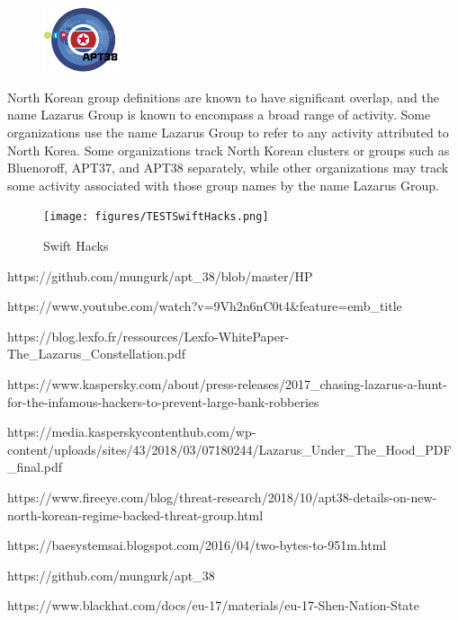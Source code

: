 \documentclass[12pt]{article}
\begin{document}
        \begin{figure}
        \centering
        \includegraphics[width=0.20\textwidth]{figures/apt38.png}
        \end{figure}
        North Korean group definitions are known to have significant overlap, and the name Lazarus Group is known to encompass a broad range of activity. Some organizations use the name Lazarus Group to refer to any activity attributed to North Korea. Some organizations track North Korean clusters or groups such as Bluenoroff, APT37, and APT38 separately, while other organizations may track some activity associated with those group names by the name Lazarus Group.
        
        \begin{figure}[H]
        \centering
        \texttt{[image: figures/TESTSwiftHacks.png]}
        \caption{Swift Hacks}
        \label{fig:SwiftHacks}
        \end{figure}
        
        https://github.com/mungurk/apt_38/blob/master/HP%
        
        https://www.youtube.com/watch?v=9Vh2n6nC0t4&feature=emb_title
        
        https://blog.lexfo.fr/ressources/Lexfo-WhitePaper-The_Lazarus_Constellation.pdf
        
        https://www.kaspersky.com/about/press-releases/2017_chasing-lazarus-a-hunt-for-the-infamous-hackers-to-prevent-large-bank-robberies
        
        https://media.kasperskycontenthub.com/wp-content/uploads/sites/43/2018/03/07180244/Lazarus_Under_The_Hood_PDF_final.pdf
        
        https://www.fireeye.com/blog/threat-research/2018/10/apt38-details-on-new-north-korean-regime-backed-threat-group.html
        
        https://baesystemsai.blogspot.com/2016/04/two-bytes-to-951m.html
        
        https://github.com/mungurk/apt_38
        
        https://www.blackhat.com/docs/eu-17/materials/eu-17-Shen-Nation-State%
        
\end{document}

